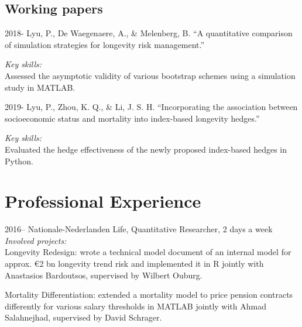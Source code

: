 \documentclass[12pt,letterpaper]{report}
\begin{document}
    \subsection*{Working papers}

    \begin{tablist}
        
        \item[2018-] \tab Lyu, P., De Waegenaere, A., \& Melenberg, B. \enquote{A quantitative comparison of simulation strategies for longevity risk management.} 
        
        \medskip
        
        \textit{Key skills:}\\
		Assessed the asymptotic validity of various bootstrap schemes using a simulation study in MATLAB.
        
        \item[2019-] \tab Lyu, P., Zhou, K. Q., \& Li, J. S. H. \enquote{Incorporating the association between socioeconomic status and mortality into index-based longevity hedges.}
        
        \medskip
        
        \textit{Key skills:}\\
       	Evaluated the hedge effectiveness of the newly proposed index-based hedges in Python.
        


    \end{tablist}

 \section*{Professional Experience}

\begin{tablist}
	
	\item[2016--] \tab Nationale-Nederlanden Life, Quantitative Researcher, 2 days a week\\
	\medskip
	\textit{Involved projects:}\\
	Longevity Redesign: wrote a technical model document of an internal model for approx. €2 bn longevity trend risk and implemented it in R jointly with Anastasios Bardoutsos, supervised by Wilbert Ouburg.\\
	
	\medskip
	
	Mortality Differentiation: extended a mortality model to price pension contracts differently for various salary thresholds in MATLAB jointly with Ahmad Salahnejhad, supervised by David Schrager.
	
	\medskip
	
	

	
\end{tablist}
\end{document}
